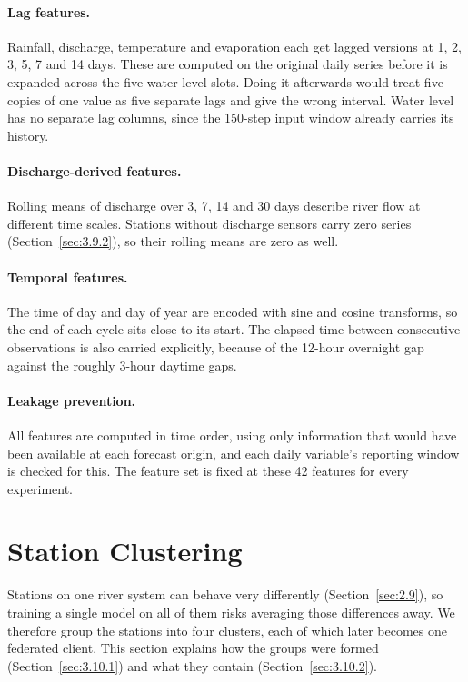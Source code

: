 \paragraph{Lag features.}
Rainfall, discharge, temperature and evaporation each get lagged versions at 1,
2, 3, 5, 7 and 14 days. These are computed on the original daily series before
it is expanded across the five water-level slots. Doing it afterwards would
treat five copies of one value as five separate lags and give the wrong
interval. Water level has no separate lag columns, since the 150-step input
window already carries its history.

\paragraph{Discharge-derived features.}
Rolling means of discharge over 3, 7, 14 and 30 days describe river flow at
different time scales. Stations without discharge sensors carry zero series
(Section~\ref{sec:3.9.2}), so their rolling means are zero as well.

\paragraph{Temporal features.}
The time of day and day of year are encoded with sine and cosine transforms, so
the end of each cycle sits close to its start. The elapsed time between
consecutive observations is also carried explicitly, because of the 12-hour
overnight gap against the roughly 3-hour daytime gaps.

\paragraph{Leakage prevention.}
All features are computed in time order, using only information that would have
been available at each forecast origin, and each daily variable's reporting
window is checked for this. The feature set is fixed at these 42 features for
every experiment.

\section{Station Clustering}
\label{sec:3.10}

Stations on one river system can behave very differently
(Section~\ref{sec:2.9}), so training a single model on all of them risks
averaging those differences away. We therefore group the stations into four
clusters, each of which later becomes one federated client. This section
explains how the groups were formed (Section~\ref{sec:3.10.1}) and what they
contain (Section~\ref{sec:3.10.2}).

